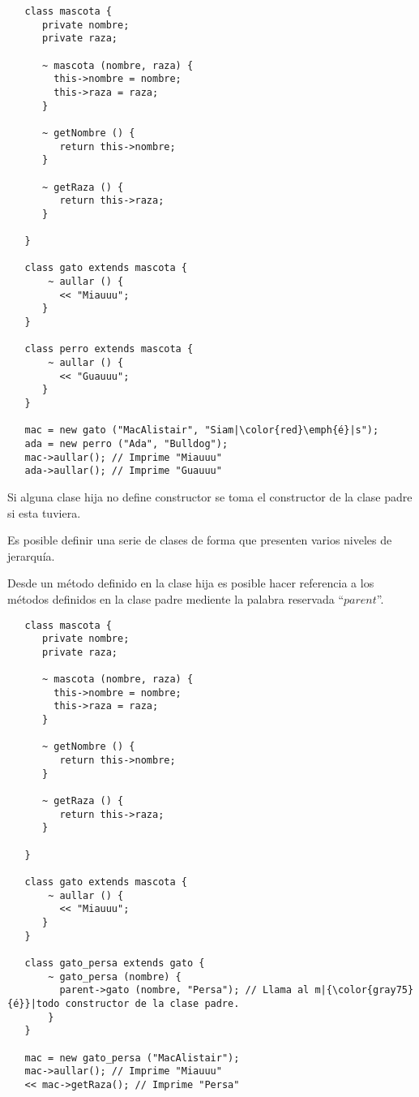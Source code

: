 \begin{lstlisting}
   class mascota {
      private nombre; 
      private raza;
      
      ~ mascota (nombre, raza) { 
        this->nombre = nombre; 
        this->raza = raza;
      }
      
      ~ getNombre () {
         return this->nombre;
      }
      
      ~ getRaza () {
         return this->raza;
      }
      
   }

   class gato extends mascota {
       ~ aullar () { 
         << "Miauuu";
      }
   }

   class perro extends mascota {
       ~ aullar () { 
         << "Guauuu";
      }
   }
   
   mac = new gato ("MacAlistair", "Siam|\color{red}\emph{é}|s"); 
   ada = new perro ("Ada", "Bulldog");  
   mac->aullar(); // Imprime "Miauuu"
   ada->aullar(); // Imprime "Guauuu"
\end{lstlisting}

Si alguna clase hija no define constructor se toma el constructor de la clase padre si esta tuviera. 

Es posible definir una serie de clases de forma que presenten varios niveles de jerarquía.



Desde un método definido en la clase hija es posible hacer referencia a los métodos definidos en la clase padre 
mediente la palabra reservada ``$parent$''. \\

\begin{lstlisting}
   class mascota {
      private nombre; 
      private raza;
      
      ~ mascota (nombre, raza) { 
        this->nombre = nombre; 
        this->raza = raza;
      }
      
      ~ getNombre () {
         return this->nombre;
      }
      
      ~ getRaza () {
         return this->raza;
      }
      
   }

   class gato extends mascota {
       ~ aullar () { 
         << "Miauuu";
      }
   }

   class gato_persa extends gato {
       ~ gato_persa (nombre) {
         parent->gato (nombre, "Persa"); // Llama al m|{\color{gray75}{é}}|todo constructor de la clase padre.
       }
   }
   
   mac = new gato_persa ("MacAlistair"); 
   mac->aullar(); // Imprime "Miauuu"
   << mac->getRaza(); // Imprime "Persa"
\end{lstlisting}

